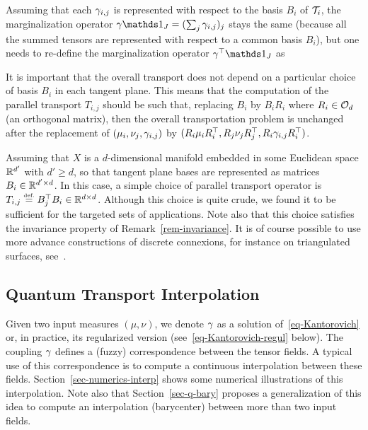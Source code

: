Assuming that each $\gamma_{i,j}$ is represented with respect to the basis $B_i$ of $\mathcal{T}_i$, the marginalization operator $\ga \ones_J = (\sum_j \ga_{i,j})_j$ stays the same (because all the summed tensors are represented with respect to a common basis $B_i$), but one needs to re-define the marginalization operator $\ga^\top \ones_J$ as


\begin{rem}\label{rem-invariance}
	It is important that the overall transport does not depend on a particular choice of basis $B_i$ in each tangent plane. This means that the computation of the parallel transport $T_{i,j}$ should be such that, replacing $B_i$ by $B_i R_i$ where $R_i \in \mathcal{O}_d$ (an orthogonal matrix), then the overall transportation problem is unchanged after the replacement of $(\mu_i,\nu_j,\gamma_{i,j})$ by $(R_i \mu_i R_i^\top, R_j \nu_j R_j^\top, R_i\gamma_{i,j}R_i^\top)$.
\end{rem}

\begin{rem}
	Assuming that $X$ is a $d$-dimensional manifold embedded in some Euclidean space $\mathbb{R}^{d'}$ with $d' \geq d$, so that tangent plane bases are represented as matrices $B_i \in \mathbb{R}^{d' \times d}$. In this case, a simple choice of parallel transport operator is $T_{i,j} \eqdef B_j^\top B_i \in \RR^{d \times d}$. Although this choice is quite crude, we found it to be sufficient for the targeted sets of applications. Note also that this choice satisfies the invariance property of Remark~\ref{rem-invariance}. It is of course possible to use more advance constructions of discrete connexions, for instance on triangulated surfaces, see~\cite{crane2010trivial,liu2016discrete}.
\end{rem}

\fi

\subsection{Quantum Transport Interpolation}

\newcommand{\muA}{\mu}
\newcommand{\muB}{\nu}


Given two input measures $(\muA,\muB)$, we denote $\gamma$ as a solution of~\eqref{eq-Kantorovich} or, in practice, its regularized version (see~\eqref{eq-Kantorovich-regul} below). The coupling $\gamma$ defines a (fuzzy) correspondence between the tensor fields. A typical use of this correspondence is to compute a continuous interpolation between these fields. Section~\ref{sec-numerics-interp} shows some numerical illustrations of this interpolation. Note also that Section~\ref{sec-q-bary} proposes a generalization of this idea to compute an interpolation (barycenter) between more than two input fields.  


